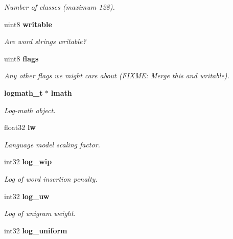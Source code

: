 \begin{CompactItemize}
\begin{CompactList}\small\item\em Number of classes (maximum 128). \item\end{CompactList}\item 
uint8 {\bf writable}\label{structngram__model__s_78a3253febced2cae4732044da466ee6}

\begin{CompactList}\small\item\em Are word strings writable? \item\end{CompactList}\item 
uint8 {\bf flags}\label{structngram__model__s_c609a2f867496d6ca719351d566db328}

\begin{CompactList}\small\item\em Any other flags we might care about (FIXME: Merge this and writable). \item\end{CompactList}\item 
{\bf logmath\_\-t} $\ast$ {\bf lmath}\label{structngram__model__s_2ca373109c651ac998b33153eb38fd95}

\begin{CompactList}\small\item\em Log-math object. \item\end{CompactList}\item 
float32 {\bf lw}\label{structngram__model__s_76ea0c65b23de80091e7c602bdb43bde}

\begin{CompactList}\small\item\em Language model scaling factor. \item\end{CompactList}\item 
int32 {\bf log\_\-wip}\label{structngram__model__s_3d6bf5632760a16e52cb881d7010d774}

\begin{CompactList}\small\item\em Log of word insertion penalty. \item\end{CompactList}\item 
int32 {\bf log\_\-uw}\label{structngram__model__s_6f0ec7b8b9d13d590bbe4b59df573abc}

\begin{CompactList}\small\item\em Log of unigram weight. \item\end{CompactList}\item 
int32 {\bf log\_\-uniform}\label{structngram__model__s_616bf871a67f9cedce17d6b589ee33ea}


\end{CompactItemize}
